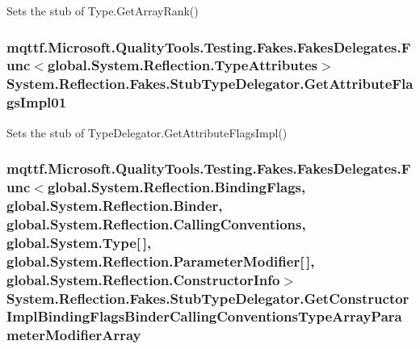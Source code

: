Sets the stub of Type.\-Get\-Array\-Rank()

\hypertarget{class_system_1_1_reflection_1_1_fakes_1_1_stub_type_delegator_ac1107302b7a5b495a7e427590edb5451}{
\subsubsection[{Get\-Attribute\-Flags\-Impl01}]{\setlength{\rightskip}{0pt plus 5cm}mqttf.\-Microsoft.\-Quality\-Tools.\-Testing.\-Fakes.\-Fakes\-Delegates.\-Func$<$global.\-System.\-Reflection.\-Type\-Attributes$>$ System.\-Reflection.\-Fakes.\-Stub\-Type\-Delegator.\-Get\-Attribute\-Flags\-Impl01}}\label{class_system_1_1_reflection_1_1_fakes_1_1_stub_type_delegator_ac1107302b7a5b495a7e427590edb5451}


Sets the stub of Type\-Delegator.\-Get\-Attribute\-Flags\-Impl()

\hypertarget{class_system_1_1_reflection_1_1_fakes_1_1_stub_type_delegator_a86a2b6bf2f354b2f4a3179876d48989c}{
\subsubsection[{Get\-Constructor\-Impl\-Binding\-Flags\-Binder\-Calling\-Conventions\-Type\-Array\-Parameter\-Modifier\-Array}]{\setlength{\rightskip}{0pt plus 5cm}mqttf.\-Microsoft.\-Quality\-Tools.\-Testing.\-Fakes.\-Fakes\-Delegates.\-Func$<$global.\-System.\-Reflection.\-Binding\-Flags, global.\-System.\-Reflection.\-Binder, global.\-System.\-Reflection.\-Calling\-Conventions, global.\-System.\-Type\mbox{[}$\,$\mbox{]}, global.\-System.\-Reflection.\-Parameter\-Modifier\mbox{[}$\,$\mbox{]}, global.\-System.\-Reflection.\-Constructor\-Info$>$ System.\-Reflection.\-Fakes.\-Stub\-Type\-Delegator.\-Get\-Constructor\-Impl\-Binding\-Flags\-Binder\-Calling\-Conventions\-Type\-Array\-Parameter\-Modifier\-Array}}\label{class_system_1_1_reflection_1_1_fakes_1_1_stub_type_delegator_a86a2b6bf2f354b2f4a3179876d48989c}


